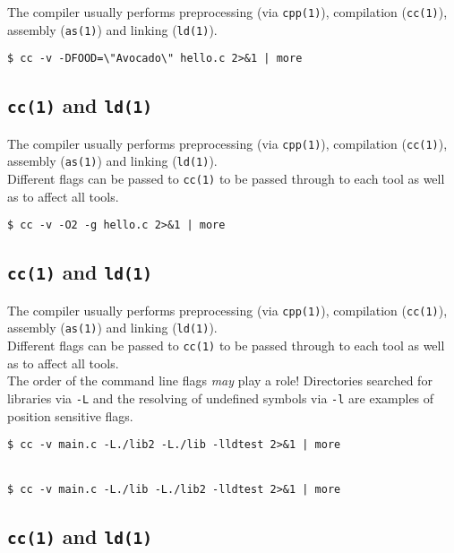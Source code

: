 \documentclass[xga]{xdvislides}
\begin{document}
The compiler usually performs preprocessing (via {\tt cpp(1)}), compilation
({\tt cc(1)}), assembly ({\tt as(1)}) and linking ({\tt ld(1)}).

\begin{verbatim}
$ cc -v -DFOOD=\"Avocado\" hello.c 2>&1 | more
\end{verbatim}


\subsection{{\tt cc(1)} and {\tt ld(1)}}

The compiler usually performs preprocessing (via {\tt cpp(1)}), compilation
({\tt cc(1)}), assembly ({\tt as(1)}) and linking ({\tt ld(1)}).
\\

Different flags can be passed to {\tt cc(1)} to be passed through to each tool
as well as to affect all tools.  \\

\begin{verbatim}
$ cc -v -O2 -g hello.c 2>&1 | more
\end{verbatim}

\subsection{{\tt cc(1)} and {\tt ld(1)}}

The compiler usually performs preprocessing (via {\tt cpp(1)}), compilation
({\tt cc(1)}), assembly ({\tt as(1)}) and linking ({\tt ld(1)}).
\\

Different flags can be passed to {\tt cc(1)} to be passed through to each tool
as well as to affect all tools.  \\

The order of the command line flags {\em may} play a role!
Directories searched for libraries via {\tt -L} and the resolving of undefined
symbols via {\tt -l} are examples of position sensitive flags.
\\

\begin{verbatim}
$ cc -v main.c -L./lib2 -L./lib -lldtest 2>&1 | more


$ cc -v main.c -L./lib -L./lib2 -lldtest 2>&1 | more
\end{verbatim}


\subsection{{\tt cc(1)} and {\tt ld(1)}}
\end{document}
